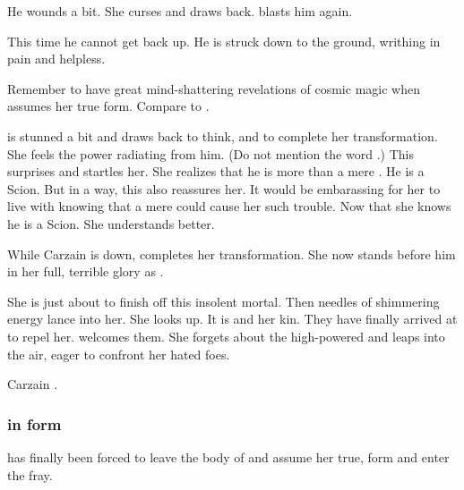 
He wounds \Takestsha a bit. 
She curses and draws back. 
\Takestsha blasts him again. 

This time he cannot get back up.
He is struck down to the ground, writhing in pain and helpless. 

Remember to have great mind-shattering revelations of cosmic magic when \Nzessuacrith assumes her true form. 
Compare to \cite{StephenMarkRainey:Signals}. 

\Takestsha is stunned a bit and draws back to think, and to complete her transformation. 
She feels the \sathariah power radiating from him. 
(Do not mention the word \quo{\sathariah}.) 
This surprises and startles her.
She realizes that he is more than a mere \human. 
He is a Scion. 
But in a way, this also reassures her.
It would be embarassing for her to live with knowing that a mere \human could cause her such trouble. 
Now that she knows he is a Scion. 
She understands better. 

While Carzain is down, \Takestsha completes her transformation.
She now stands before him in her full, terrible glory as \Nzessuacrith. 

She is just about to finish off this insolent mortal.
Then needles of shimmering energy lance into her.
She looks up.
It is \Achsah and her \resphan kin.
They have finally arrived at \Forclin to repel her.
\Nzessuacrith welcomes them.
She forgets about the high-powered \human and leaps into the air, eager to confront her hated foes. 

Carzain . 





\subsubsection{\Nzessuacrith in \draconian form}
\Nzessuacrith{} has finally been forced to leave the body of \Takestsha{} and assume her true, \draconic{} form and enter the fray. 

